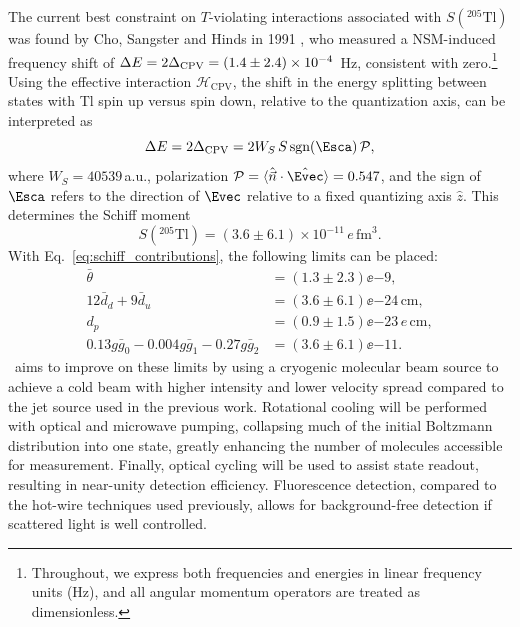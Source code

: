 The current best constraint on $T$-violating interactions associated with $S\left(^{205}\mathrm{Tl}\right)$ was found by Cho, Sangster and Hinds in 1991 \cite{cho1989tenfold, cho1991search}, who measured a NSM-induced frequency shift of $\Delta E = 2\Delta_{\rm CPV} = \left(1.4\pm 2.4\right)\times 10^{-4}$~Hz, consistent with zero.\footnote{Throughout, we express both frequencies and energies in linear frequency units (Hz), and all angular momentum operators are treated as dimensionless.} 
Using the effective interaction $\mathcal{H}_\text{CPV}$, the shift in the energy splitting between states with Tl spin up versus spin down, relative to the quantization axis, can be interpreted as
\begin{equation}
    \Delta E= 2 \Delta_{\rm CPV} = 2 W_S\,S\, \textrm{sgn}(\Esca) \,\mathcal{P},
    \label{eq:frequency_shift_due_to_NSM}
\end{equation}
where $W_S = 40539\,$a.u.,
polarization $\mathcal{P} = \langle\hat{\vec{n}} \cdot \hat{\Evec}\rangle = 0.547$, and the sign of $\Esca$ refers to the direction of $\Evec$ relative to a fixed quantizing axis $\hat{z}$.  This determines the Schiff moment \cite{PhysRevA.101.042501, PhysRevLett.88.073001}
\begin{equation}
    S\left(^{205}\mathrm{Tl}\right) = \left(3.6\pm 6.1\right)\times 10^{-11}\,e\,\mathrm{fm}^3.
\end{equation}
With Eq.~\ref{eq:schiff_contributions}, the following limits can be placed:
\begin{equation}
    \label{eq:prev_best_lims}
    \begin{split}
        \bar{\theta} & = \left(1.3 \pm 2.3\right)\ee{-9}, \\
        12\bar{d}_d+9\bar{d}_u & = \left(3.6\pm 6.1\right)\ee{-24}\,\mathrm{cm}, \\
        d_p          & = \left(0.9 \pm 1.5\right)\ee{-23}\,e\,\mathrm{cm},\\
        0.13g\bar{g}_0 - 0.004g\bar{g}_1-0.27g\bar{g}_2 & = \left(3.6 \pm 6.1\right)\ee{-11}.
    \end{split}
\end{equation}
\CENTREX\ aims to improve on these limits by using a cryogenic molecular beam source to achieve a cold beam with higher intensity and lower velocity spread compared to the jet source used in the previous work. Rotational cooling will be performed with optical and microwave pumping, collapsing much of the initial Boltzmann distribution into one state, greatly enhancing the number of molecules accessible for measurement. Finally, optical cycling will be used to assist state readout, resulting in near-unity detection efficiency. Fluorescence detection, compared to the hot-wire techniques used previously, allows for background-free detection if scattered light is well controlled.

